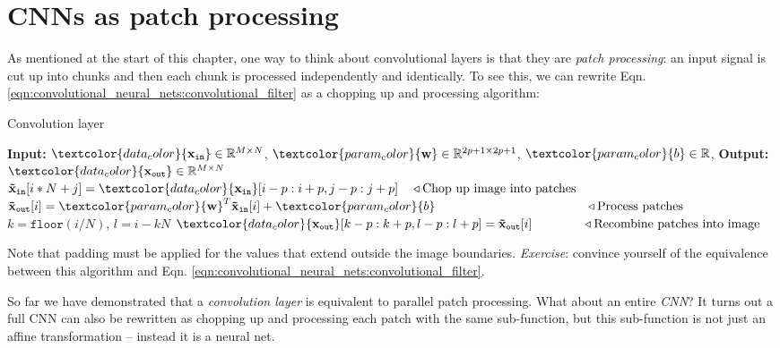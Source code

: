 \section{CNNs as patch processing}
As mentioned at the start of this chapter, one way to think about convolutional layers is that they are \textit{patch processing}: an input signal is cut up into chunks and then each chunk is processed independently and identically. To see this, we can rewrite Eqn. \ref{eqn:convolutional_neural_nets:convolutional_filter} as a chopping up and processing algorithm:
\begin{algorithm}[h]
\caption{Convolution layer}
\label{alg:convolutional_neural_nets:conv_as_patch_processing}
\SetAlgoVlined
\DontPrintSemicolon
{\bf Input:} $\textcolor{data_color}{\xin} \in \mathbb{R}^{M \times N}$, $\textcolor{param_color}{\mathbf{w}} \in \mathbb{R}^{2p+1 \times 2p+1}$, $\textcolor{param_color}{b} \in \mathbb{R}$, 
{\bf Output:} $\textcolor{data_color}{\xout} \in \mathbb{R}^{M \times N}$\;
 {
{
    $\mathbf{\xinpatch}[i*N+j] = \textcolor{data_color}{\xin}[i-p:i+p, j-p:j+p]\quad\triangleleft \text{Chop up image into patches}$\;
}
}
 {
    $\mathbf{\xoutpatch}[i] = \textcolor{param_color}{\mathbf{w}}^T\mathbf{\xinpatch}[i] + \textcolor{param_color}{b} \quad\quad\quad\quad\quad\quad\quad\quad\quad\quad\quad\quad\triangleleft \text{Process patches}$\;
}
 {
    $k = \texttt{floor}(i/N)$,
    $l = i - kN$\;
    $\textcolor{data_color}{\xout}[k-p:k+p,l-p:l+p] = \mathbf{\xoutpatch}[i] \quad\quad\quad\quad\triangleleft \text{Recombine patches into image}$\;
}
\label{alg:convoultional_neural_nets:conv_layer_as_patch_processing}
\end{algorithm}

Note that padding must be applied for the values that extend outside the image boundaries. \textit{Exercise}: convince yourself of the equivalence between this algorithm and Eqn. \ref{eqn:convolutional_neural_nets:convolutional_filter}.

So far we have demonstrated that a \textit{convolution layer} is equivalent to parallel patch processing. What about an entire \textit{CNN}? It turns out a full CNN can also be rewritten as chopping up and processing each patch with the same sub-function, but this sub-function is not just an affine transformation -- instead it is a neural net.

